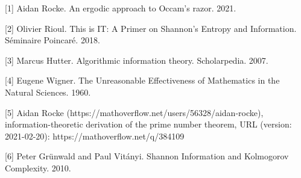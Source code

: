 \documentclass{article}
\begin{document}
\small
[1] Aidan Rocke. An ergodic approach to Occam's razor. 2021. 

[2] Olivier Rioul. This is IT: A Primer on Shannon’s Entropy and Information. Séminaire Poincaré. 2018.

[3] Marcus Hutter. Algorithmic information theory. Scholarpedia. 2007.

[4] Eugene Wigner. The Unreasonable Effectiveness of Mathematics in the Natural Sciences. 1960.

[5] Aidan Rocke (https://mathoverflow.net/users/56328/aidan-rocke), information-theoretic derivation of the prime number theorem, URL (version: 2021-02-20): https://mathoverflow.net/q/384109

[6] Peter Grünwald and Paul Vitányi. Shannon Information and Kolmogorov Complexity. 2010.
\end{document}
